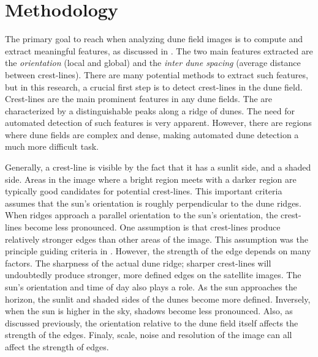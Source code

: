 \section{Methodology} \label{sec:methodology}
The primary goal to reach when analyzing dune field images is to compute and extract meaningful features, as discussed in \cite{ewing-kocurek-lake-2006,ewing-peyret-kocurek-bourke-2010}. The two main features extracted are the \emph{orientation} (local and global) and the \emph{inter dune spacing} (average distance between crest-lines). There are many potential methods to extract such features, but in this research, a crucial first step is to detect crest-lines in the dune field. Crest-lines are the main prominent features in any dune fields. The are characterized by a distinguishable peaks along a ridge of dunes. The need for automated detection of such features is very apparent. However, there are regions where dune fields are complex and dense, making automated dune detection a much more difficult task.

Generally, a crest-line is visible by the fact that it has a sunlit side, and a shaded side. Areas in the image where a bright region meets with a darker region are typically good candidates for potential crest-lines. This important criteria assumes that the sun's orientation is roughly perpendicular to the dune ridges. When ridges approach a parallel orientation to the sun's orientation, the crest-lines become less pronounced. One assumption is that crest-lines produce relatively stronger edges than other areas of the image. This assumption was the principle guiding criteria in \cite{2015_automated_mapping_of_linear_dunefield}. However, the strength of the edge depends on many factors. The sharpness of the actual dune ridge; sharper crest-lines will undoubtedly produce stronger, more defined edges on the satellite images. The sun's orientation and time of day also plays a role. As the sun approaches the horizon, the sunlit and shaded sides of the dunes become more defined. Inversely, when the sun is higher in the sky, shadows become less pronounced. Also, as discussed previously, the orientation relative to the dune field itself affects the strength of the edges. Finaly, scale, noise and resolution of the image can all affect the strength of edges.

